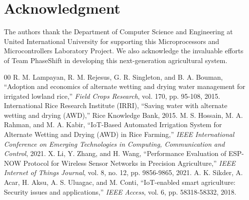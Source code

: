 \documentclass[conference]{IEEEtran}
\begin{document}
\section*{Acknowledgment}
The authors thank the Department of Computer Science and Engineering at United International University for supporting this Microprocessors and Microcontrollers Laboratory Project. We also acknowledge the invaluable efforts of Team PhaseShift in developing this next-generation agricultural system.

\begin{thebibliography}{00}
 R. M. Lampayan, R. M. Rejesus, G. R. Singleton, and B. A. Bouman, ``Adoption and economics of alternate wetting and drying water management for irrigated lowland rice,'' \textit{Field Crops Research}, vol. 170, pp. 95-108, 2015.
 International Rice Research Institute (IRRI), ``Saving water with alternate wetting and drying (AWD),'' Rice Knowledge Bank, 2015.
 M. S. Hossain, M. A. Rahman, and M. A. Kabir, ``IoT-Based Automated Irrigation System for Alternate Wetting and Drying (AWD) in Rice Farming,'' \textit{IEEE International Conference on Emerging Technologies in Computing, Communication and Control}, 2021.
 X. Li, Y. Zhang, and H. Wang, ``Performance Evaluation of ESP-NOW Protocol for Wireless Sensor Networks in Precision Agriculture,'' \textit{IEEE Internet of Things Journal}, vol. 8, no. 12, pp. 9856-9865, 2021.
 A. K. Sikder, A. Acar, H. Aksu, A. S. Uluagac, and M. Conti, ``IoT-enabled smart agriculture: Security issues and applications,'' \textit{IEEE Access}, vol. 6, pp. 58318-58332, 2018.
\end{thebibliography}
\end{document}

